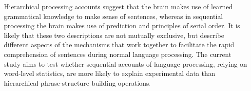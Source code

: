 \documentclass[10pt,letterpaper]{article}
\begin{document}


Hierarchical processing accounts suggest that the brain makes use of
learned grammatical knowledge to make sense of sentences, whereas in
sequential processing the brain makes use of prediction and principles
of serial order. It is likely that these two descriptions are not
mutually exclusive, but describe different aspects of the mechanisms
that work together to facilitate the rapid comprehension of sentences
during normal language processing. The current study aims to test
whether sequential accounts of language processing, relying on
word-level statistics, are more likely to explain experimental data
than hierarchical phrase-structure building operations. 
\end{document}
